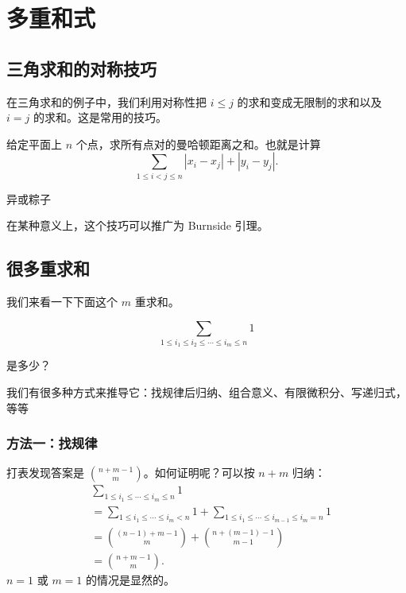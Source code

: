 \section{多重和式}

\subsection{三角求和的对称技巧}
    在三角求和的例子中，我们利用对称性把 $i\le j$ 的求和变成无限制的求和以及 $i=j$ 的求和。这是常用的技巧。

    \begin{example}
        给定平面上 $n$ 个点，求所有点对的曼哈顿距离之和。也就是计算 
        $$
        \sum_{1\le i<j\le n}|x_i-x_j|+|y_i-y_j|.
        $$
    \end{example}

    \begin{example}
        异或粽子
    \end{example}
    
    在某种意义上，这个技巧可以推广为 Burnside 引理。

\subsection{很多重求和}

我们来看一下下面这个 $m$ 重求和。

\begin{example}
    $$
    \sum_{1\le i_1\le i_2\le\cdots\le i_m\le n} 1
    $$

    是多少？

    我们有很多种方式来推导它：找规律后归纳、组合意义、有限微积分、写递归式，等等
\end{example}

\subsubsection*{方法一：找规律}
    打表发现答案是 $\binom{n+m-1}{m}$。如何证明呢？可以按 $n+m$ 归纳：
    $$
    \begin{aligned}
    &\sum_{1\le i_1\le \cdots\le i_m\le n}1\\
    &=\sum_{1\le i_1\le \cdots\le i_m<n}1+\sum_{1\le i_1\le \cdots\le i_{m-1}\le i_m=n}1\\
    &=\binom{(n-1)+m-1}{m}+\binom{n+(m-1)-1}{m-1}\\
    &=\binom{n+m-1}{m}.
    \end{aligned}
    $$
    $n=1$ 或 $m=1$ 的情况是显然的。

